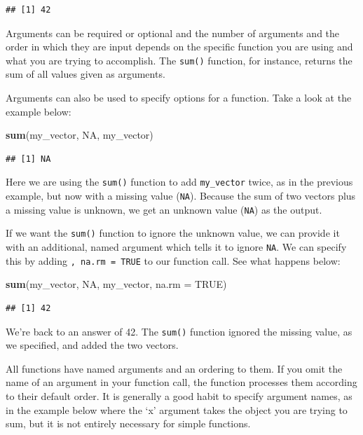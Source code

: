 \documentclass[
]{book}
\newenvironment{Shaded}{\begin{snugshade}}{\end{snugshade}}
\newcommand{\AttributeTok}[1]{\textcolor[rgb]{0.13,0.29,0.53}{#1}}
\newcommand{\ConstantTok}[1]{\textcolor[rgb]{0.56,0.35,0.01}{#1}}
\newcommand{\FunctionTok}[1]{\textcolor[rgb]{0.13,0.29,0.53}{\textbf{#1}}}
\newcommand{\NormalTok}[1]{#1}
\begin{document}
\begin{verbatim}
## [1] 42
\end{verbatim}

Arguments can be required or optional and the number of arguments and the order in which they are input depends on the specific function you are using and what you are trying to accomplish. The \texttt{sum()} function, for instance, returns the sum of all values given as arguments.

Arguments can also be used to specify options for a function. Take a look at the example below:

\begin{Shaded}
\begin{Highlighting}[]
\FunctionTok{sum}\NormalTok{(my\_vector, }\ConstantTok{NA}\NormalTok{, my\_vector)}
\end{Highlighting}
\end{Shaded}

\begin{verbatim}
## [1] NA
\end{verbatim}

Here we are using the \texttt{sum()} function to add \texttt{my\_vector} twice, as in the previous example, but now with a missing value (\texttt{NA}). Because the sum of two vectors plus a missing value is unknown, we get an unknown value (\texttt{NA}) as the output.

If we want the \texttt{sum()} function to ignore the unknown value, we can provide it with an additional, named argument which tells it to ignore \texttt{NA}. We can specify this by adding \texttt{,\ na.rm\ =\ TRUE} to our function call. See what happens below:

\begin{Shaded}
\begin{Highlighting}[]
\FunctionTok{sum}\NormalTok{(my\_vector, }\ConstantTok{NA}\NormalTok{, my\_vector, }\AttributeTok{na.rm =} \ConstantTok{TRUE}\NormalTok{)}
\end{Highlighting}
\end{Shaded}

\begin{verbatim}
## [1] 42
\end{verbatim}

We're back to an answer of 42. The \texttt{sum()} function ignored the missing value, as we specified, and added the two vectors.

All functions have named arguments and an ordering to them. If you omit the name of an argument in your function call, the function processes them according to their default order. It is generally a good habit to specify argument names, as in the example below where the `x' argument takes the object you are trying to sum, but it is not entirely necessary for simple functions.
\end{document}
